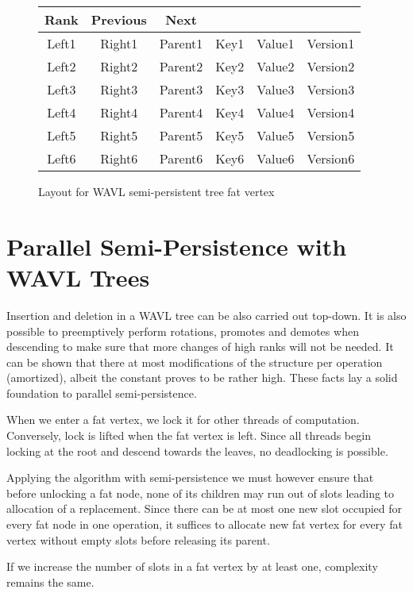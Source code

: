 \begin{figure}
	\centering
	\ttfamily
	\begin{tabular}{cccccc}
		Rank  & Previous &  Next   &      & &          \\ \hline
		Left1 &  Right1  & Parent1 & Key1 & Value1 &  Version1 \\ \hline
		Left2 &  Right2  & Parent2 & Key2 & Value2 & Version2 \\ \hline
		Left3 &  Right3  & Parent3 & Key3 & Value3 & Version3 \\ \hline
		Left4 &  Right4  & Parent4 & Key4 & Value4 & Version4 \\ \hline
		Left5 &  Right5  & Parent5 & Key5 & Value5 & Version5 \\ \hline
		Left6 &  Right6  & Parent6 & Key6 & Value6 & Version6 \\ \hline
	\end{tabular}
	\normalfont
\caption{Layout for WAVL semi-persistent tree fat vertex}
\end{figure}

\section{Parallel Semi-Persistence with WAVL Trees}

Insertion and deletion in a WAVL tree can be also carried out top-down. %
It is also possible to preemptively perform rotations, promotes and demotes when descending to make sure that more changes of high ranks will not be needed. It can be shown that there at most  modifications of the structure per operation (amortized), albeit the constant proves to be rather high. These facts lay a solid foundation to parallel semi-persistence.

When we enter a fat vertex, we lock it for other threads of computation. Conversely, lock is lifted when the fat vertex is left. Since all threads begin locking at the root and descend towards the leaves, no deadlocking is possible.

Applying the algorithm with semi-persistence we must however ensure that before unlocking a fat node, none of its children may run out of slots leading to allocation of a replacement. Since there can be at most one new slot occupied for every fat node in one operation, it suffices to allocate new fat vertex for every fat vertex without empty slots before releasing its parent.

If we increase the number of slots in a fat vertex by at least one, complexity remains the same.

